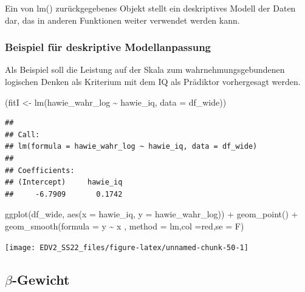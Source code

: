 \documentclass[
]{book}
\newenvironment{Shaded}{\begin{snugshade}}{\end{snugshade}}
\newcommand{\AttributeTok}[1]{\textcolor[rgb]{0.77,0.63,0.00}{#1}}
\newcommand{\FunctionTok}[1]{\textcolor[rgb]{0.00,0.00,0.00}{#1}}
\newcommand{\NormalTok}[1]{#1}
\newcommand{\OtherTok}[1]{\textcolor[rgb]{0.56,0.35,0.01}{#1}}
\newcommand{\SpecialCharTok}[1]{\textcolor[rgb]{0.00,0.00,0.00}{#1}}
\newcommand{\StringTok}[1]{\textcolor[rgb]{0.31,0.60,0.02}{#1}}
\begin{document}
Ein von lm() zurückgegebenes Objekt stellt ein deskriptives Modell der Daten dar, das in anderen Funktionen weiter verwendet werden kann.

\hypertarget{beispiel-fuxfcr-deskriptive-modellanpassung}{%
\subsubsection{Beispiel für deskriptive Modellanpassung}\label{beispiel-fuxfcr-deskriptive-modellanpassung}}

Als Beispiel soll die Leistung auf der Skala zum wahrnehmungsgebundenen logischen Denken als Kriterium mit dem IQ als Prädiktor vorhergesagt werden.

\begin{Shaded}
\begin{Highlighting}[]
\NormalTok{(fitI }\OtherTok{\textless{}{-}} \FunctionTok{lm}\NormalTok{(hawie\_wahr\_log }\SpecialCharTok{\textasciitilde{}}\NormalTok{ hawie\_iq, }\AttributeTok{data =}\NormalTok{ df\_wide)) }
\end{Highlighting}
\end{Shaded}

\begin{verbatim}
## 
## Call:
## lm(formula = hawie_wahr_log ~ hawie_iq, data = df_wide)
## 
## Coefficients:
## (Intercept)     hawie_iq  
##     -6.7909       0.1742
\end{verbatim}

\begin{Shaded}
\begin{Highlighting}[]
\FunctionTok{ggplot}\NormalTok{(df\_wide, }\FunctionTok{aes}\NormalTok{(}\AttributeTok{x =}\NormalTok{ hawie\_iq, }\AttributeTok{y =}\NormalTok{ hawie\_wahr\_log)) }\SpecialCharTok{+}
  \FunctionTok{geom\_point}\NormalTok{() }\SpecialCharTok{+}
  \FunctionTok{geom\_smooth}\NormalTok{(}\AttributeTok{formula =}\NormalTok{  y }\SpecialCharTok{\textasciitilde{}}\NormalTok{ x ,}
              \AttributeTok{method =} \StringTok{\textquotesingle{}lm\textquotesingle{}}\NormalTok{,}\AttributeTok{col =}\StringTok{\textquotesingle{}red\textquotesingle{}}\NormalTok{,}\AttributeTok{se =}\NormalTok{ F)}
\end{Highlighting}
\end{Shaded}

\begin{center}\texttt{[image: EDV2\_SS22\_files/figure-latex/unnamed-chunk-50-1]} \end{center}

\hypertarget{beta-gewicht}{%
\subsection{\texorpdfstring{\(\beta\)-Gewicht}{\textbackslash beta-Gewicht}}\label{beta-gewicht}}
\end{document}
